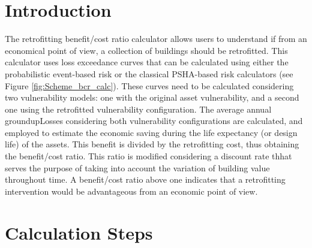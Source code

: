\section{Introduction}

The retrofitting benefit/cost ratio calculator allows users to understand if from an economical point of view, a collection of buildings should be retrofitted. This calculator uses loss exceedance curves that can be calculated using either the probabilistic event-based risk or the classical PSHA-based risk calculators (see Figure \ref{fig:Scheme_bcr_calc}). These curves need to be calculated considering two \glspl{vulnerability model}: one with the original asset vulnerability, and a second one using the retrofitted vulnerability configuration. The average annual \gls{groundupLosses} considering both vulnerability configurations are calculated, and employed to estimate the economic saving during the life expectancy (or design life) of the \glspl{asset}. This benefit is divided by the retrofitting cost, thus obtaining the benefit/cost ratio. This ratio is modified considering a discount rate thhat serves the purpose of taking into account the variation of building value throughout time. A benefit/cost ratio above one indicates that a retrofitting intervention would be advantageous from an economic point of view.

\section{Calculation Steps}

